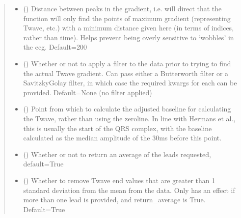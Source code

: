 \documentclass[letterpaper,10pt,english]{sphinxmanual}
\begin{document}
\begin{fulllineitems}
\begin{quote}
\begin{description}
\begin{itemize}
\item {} 
\sphinxAtStartPar
{} (\sphinxstyleliteralemphasis{\sphinxupquote{, }}) \textendash{} Distance between peaks in the gradient, i.e. will direct that the function will only find the points of
maximum gradient (representing T\sphinxhyphen{}wave, etc.) with a minimum distance given here (in terms of indices,
rather than time). Helps prevent being overly sensitive to ‘wobbles’ in the ecg. Default=200

\item {} 
\sphinxAtStartPar
{} (\sphinxstyleliteralemphasis{\sphinxupquote{, }}\sphinxstyleliteralemphasis{\sphinxupquote{, }}) \textendash{} Whether or not to apply a filter to the data prior to trying to find the actual T\sphinxhyphen{}wave gradient. Can pass
either a Butterworth filter or a Savitzky\sphinxhyphen{}Golay filter, in which case the required kwargs for each can be
provided. Default=None (no filter applied)

\item {} 
\sphinxAtStartPar
{} (\sphinxstyleliteralemphasis{\sphinxupquote{, }}) \textendash{} Point from which to calculate the adjusted baseline for calculating the T\sphinxhyphen{}wave, rather than using the
zeroline. In line with Hermans et al., this is usually the start of the QRS complex, with the baseline
calculated as the median amplitude of the 30ms before this point.

\item {} 
\sphinxAtStartPar
{} (\sphinxstyleliteralemphasis{\sphinxupquote{, }}) \textendash{} Whether or not to return an average of the leads requested, default=True

\item {} 
\sphinxAtStartPar
{} (\sphinxstyleliteralemphasis{\sphinxupquote{, }}) \textendash{} Whether to remove T\sphinxhyphen{}wave end values that are greater than 1 standard deviation from the mean from the data. Only
has an effect if more than one lead is provided, and return\_average is True. Default=True


\end{itemize}
\end{description}
\end{quote}
\end{fulllineitems}
\end{document}
